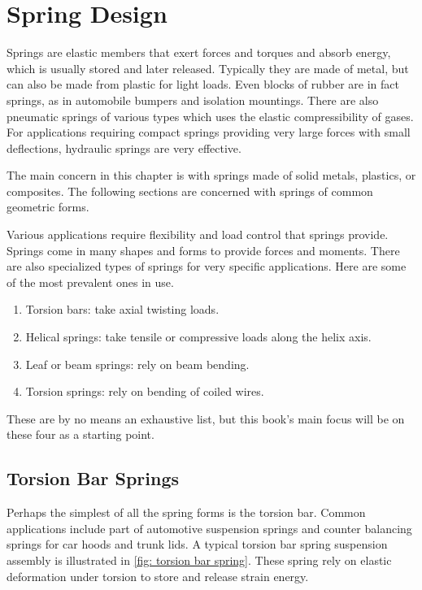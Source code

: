 \documentclass[a4paper,openany,12pt]{book}
\begin{document}
{{\chapter{Spring Design}
\label{spring-design}
Springs are elastic members that exert forces and torques and absorb
energy, which is usually stored and later released. Typically they are
made of metal, but can also be made from plastic for light loads. Even
blocks of rubber are in fact springs, as in automobile bumpers and
isolation mountings. There are also pneumatic springs of various types
which uses the elastic compressibility of gases. For applications
requiring compact springs providing very large forces with small
deflections, hydraulic springs are very effective.

The main concern in this chapter is with springs made of solid metals,
plastics, or composites. The following sections are concerned with
springs of common geometric forms.

Various applications require flexibility and load control that springs
provide. Springs come in many shapes and forms to provide forces and
moments. There are also specialized types of springs for very specific
applications. Here are some of the most prevalent ones in use.

\begin{enumerate}
\item Torsion bars: take axial twisting loads.

\item Helical springs: take tensile or compressive loads along the helix
axis.

\item Leaf or beam springs: rely on beam bending.

\item Torsion springs: rely on bending of coiled wires.
\end{enumerate}

These are by no means an exhaustive list, but this book's main focus
will be on these four as a starting point.

\section{Torsion Bar Springs}
\label{torsion-bar-springs}
Perhaps the simplest of all the spring forms is the torsion bar. Common
applications include part of automotive suspension springs and counter
balancing springs for car hoods and trunk lids. A typical torsion bar
spring suspension assembly is illustrated in
\ref{fig: torsion bar spring}. These spring
rely on elastic deformation under torsion to store and release strain
energy.


}}
\end{document}
